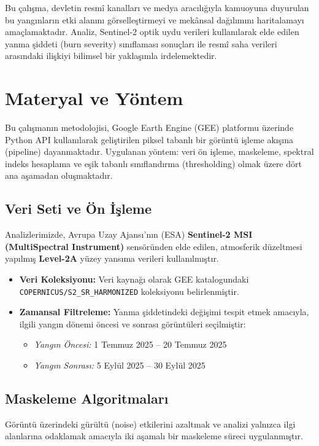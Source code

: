 \documentclass[11pt,a4paper]{article}
\begin{document}
Bu çalışma, devletin resmî kanalları ve medya aracılığıyla kamuoyuna duyurulan bu yangınların etki alanını görselleştirmeyi ve mekânsal dağılımını haritalamayı amaçlamaktadır. Analiz, Sentinel-2 optik uydu verileri kullanılarak elde edilen yanma şiddeti (burn severity) sınıflaması sonuçları ile resmî saha verileri arasındaki ilişkiyi bilimsel bir yaklaşımla irdelemektedir.



\section{Materyal ve Yöntem}
Bu çalışmanın metodolojisi, Google Earth Engine (GEE) platformu üzerinde Python API kullanılarak geliştirilen piksel tabanlı bir görüntü işleme akışına (pipeline) dayanmaktadır. 
Uygulanan yöntem: veri ön işleme, maskeleme, spektral indeks hesaplama ve eşik tabanlı sınıflandırma (thresholding) olmak üzere dört ana aşamadan oluşmaktadır.

\subsection{Veri Seti ve Ön İşleme}
Analizlerimizde, Avrupa Uzay Ajansı'nın (ESA) \textbf{Sentinel-2 MSI (MultiSpectral Instrument)} sensöründen elde edilen, atmosferik düzeltmesi yapılmış \textbf{Level-2A} yüzey yansıma verileri kullanılmıştır.

\begin{itemize}
    \item \textbf{Veri Koleksiyonu:} Veri kaynağı olarak GEE katalogundaki \texttt{COPERNICUS/S2\_SR\_HARMONIZED} koleksiyonu belirlenmiştir.
    \item \textbf{Zamansal Filtreleme:} Yanma şiddetindeki değişimi tespit etmek amacıyla, ilgili yangın dönemi öncesi ve sonrası görüntüleri seçilmiştir:
    \begin{itemize}
        \item \textit{Yangın Öncesi:} 1 Temmuz 2025 -- 20 Temmuz 2025
        \item \textit{Yangın Sonrası:} 5 Eylül 2025 -- 30 Eylül 2025
    \end{itemize}
\end{itemize}

\subsection{Maskeleme Algoritmaları}
Görüntü üzerindeki gürültü (noise) etkilerini azaltmak ve analizi yalnızca ilgi alanlarına odaklamak amacıyla iki aşamalı bir maskeleme süreci uygulanmıştır.
\end{document}
